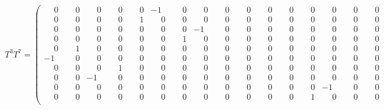 \documentclass[10pt]{article}
\begin{document}
\[
T^{3}T^{7} = \left(\begin{smallmatrix}
\phantom{-}0 & \phantom{-}0 & \phantom{-}0 & \phantom{-}0 & \phantom{-}0 & -1 & \phantom{-}0 & \phantom{-}0 & \phantom{-}0 & \phantom{-}0 & \phantom{-}0 & \phantom{-}0 & \phantom{-}0 & \phantom{-}0 & \phantom{-}0 & \phantom{-}0 \\
\phantom{-}0 & \phantom{-}0 & \phantom{-}0 & \phantom{-}0 & \phantom{-}1 & \phantom{-}0 & \phantom{-}0 & \phantom{-}0 & \phantom{-}0 & \phantom{-}0 & \phantom{-}0 & \phantom{-}0 & \phantom{-}0 & \phantom{-}0 & \phantom{-}0 & \phantom{-}0 \\
\phantom{-}0 & \phantom{-}0 & \phantom{-}0 & \phantom{-}0 & \phantom{-}0 & \phantom{-}0 & \phantom{-}0 & -1 & \phantom{-}0 & \phantom{-}0 & \phantom{-}0 & \phantom{-}0 & \phantom{-}0 & \phantom{-}0 & \phantom{-}0 & \phantom{-}0 \\
\phantom{-}0 & \phantom{-}0 & \phantom{-}0 & \phantom{-}0 & \phantom{-}0 & \phantom{-}0 & \phantom{-}1 & \phantom{-}0 & \phantom{-}0 & \phantom{-}0 & \phantom{-}0 & \phantom{-}0 & \phantom{-}0 & \phantom{-}0 & \phantom{-}0 & \phantom{-}0 \\
\phantom{-}0 & \phantom{-}1 & \phantom{-}0 & \phantom{-}0 & \phantom{-}0 & \phantom{-}0 & \phantom{-}0 & \phantom{-}0 & \phantom{-}0 & \phantom{-}0 & \phantom{-}0 & \phantom{-}0 & \phantom{-}0 & \phantom{-}0 & \phantom{-}0 & \phantom{-}0 \\
-1 & \phantom{-}0 & \phantom{-}0 & \phantom{-}0 & \phantom{-}0 & \phantom{-}0 & \phantom{-}0 & \phantom{-}0 & \phantom{-}0 & \phantom{-}0 & \phantom{-}0 & \phantom{-}0 & \phantom{-}0 & \phantom{-}0 & \phantom{-}0 & \phantom{-}0 \\
\phantom{-}0 & \phantom{-}0 & \phantom{-}0 & \phantom{-}1 & \phantom{-}0 & \phantom{-}0 & \phantom{-}0 & \phantom{-}0 & \phantom{-}0 & \phantom{-}0 & \phantom{-}0 & \phantom{-}0 & \phantom{-}0 & \phantom{-}0 & \phantom{-}0 & \phantom{-}0 \\
\phantom{-}0 & \phantom{-}0 & -1 & \phantom{-}0 & \phantom{-}0 & \phantom{-}0 & \phantom{-}0 & \phantom{-}0 & \phantom{-}0 & \phantom{-}0 & \phantom{-}0 & \phantom{-}0 & \phantom{-}0 & \phantom{-}0 & \phantom{-}0 & \phantom{-}0 \\
\phantom{-}0 & \phantom{-}0 & \phantom{-}0 & \phantom{-}0 & \phantom{-}0 & \phantom{-}0 & \phantom{-}0 & \phantom{-}0 & \phantom{-}0 & \phantom{-}0 & \phantom{-}0 & \phantom{-}0 & \phantom{-}0 & -1 & \phantom{-}0 & \phantom{-}0 \\
\phantom{-}0 & \phantom{-}0 & \phantom{-}0 & \phantom{-}0 & \phantom{-}0 & \phantom{-}0 & \phantom{-}0 & \phantom{-}0 & \phantom{-}0 & \phantom{-}0 & \phantom{-}0 & \phantom{-}0 & \phantom{-}1 & \phantom{-}0 & \phantom{-}0 & \phantom{-}0 \\

\end{smallmatrix}\]
\end{document}
